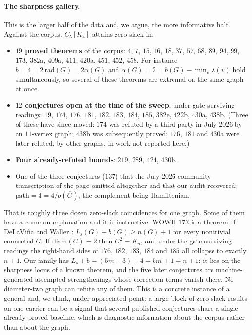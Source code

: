 \documentclass[10pt,a4paper]{article}
\theoremstyle{plain}
\theoremstyle{definition}
\newcommand{\ind}{\alpha}
\newcommand{\bipnum}{b}
\newcommand{\pathnum}{\mathrm{path}}
\newcommand{\Ls}{L_s}
\newcommand{\blow}[2]{#1[K_{#2}]}
\begin{document}
\paragraph{The sharpness gallery.} This is the larger half of the data and, we argue, the more
informative half. Against the corpus, $\blow{C_5}{4}$ attains zero slack in:
\begin{itemize}
\item \textbf{$19$ proved theorems} of the corpus: $4$, $7$, $15$, $16$, $18$, $37$, $57$, $68$,
$89$, $94$, $99$, $173$, $382$a, $409$a, $411$, $420$a, $451$, $452$, $458$. For instance
$\bipnum = 4 = 2\,\mathrm{rad}(G) = 2\ind(G)$ and $\ind(G) = 2 = \bipnum(G) - \min_v \lambda(v)$
hold simultaneously, so several of these theorems are extremal on the same graph at once.
\item \textbf{$12$ conjectures open at the time of the sweep}, under gate-surviving readings:
$19$, $174$, $176$, $181$, $182$, $183$, $184$, $185$, $382$e, $422$b, $430$a, $438$b. (Three of
these have since moved: $174$ was refuted by a third party in July 2026 by an $11$-vertex graph;
$438$b was subsequently proved; $176$, $181$ and $430$a were later refuted, by other graphs, in
work not reported here.)
\item \textbf{Four already-refuted bounds}: $219$, $289$, $424$, $430$b.
\item One of the three conjectures ($137$) that the July 2026 community transcription of the
page omitted altogether and that our audit recovered: $\pathnum = 4 = 4/p(\overline{G})$, the
complement being Hamiltonian.
\end{itemize}

That is roughly three dozen zero-slack coincidences for one graph. Some of them have a
common explanation and it is instructive. WOWII $173$ is a theorem of DeLaVi\~na and Waller
\cite{delavinawaller2008}: $\Ls(G) + \bipnum(G) \ge n(G) + 1$ for every nontrivial connected
$G$. If $\mathrm{diam}(G) = 2$ then $G^2 = K_n$, and under the gate-surviving readings the
right-hand sides of $176$, $182$, $183$, $184$ and $185$ all collapse to exactly $n+1$. Our
family has $\Ls + \bipnum = (5m-3) + 4 = 5m + 1 = n + 1$: it lies on the sharpness locus of a
known theorem, and the five later conjectures are machine-generated attempted strengthenings
whose correction terms vanish there. No diameter-two graph can refute any of them. This is a
concrete instance of a general and, we think, under-appreciated point: a large block of
zero-slack results on one carrier can be a signal that several published conjectures share a
single already-proved baseline, which is diagnostic information about the corpus rather than
about the graph.
\end{document}
